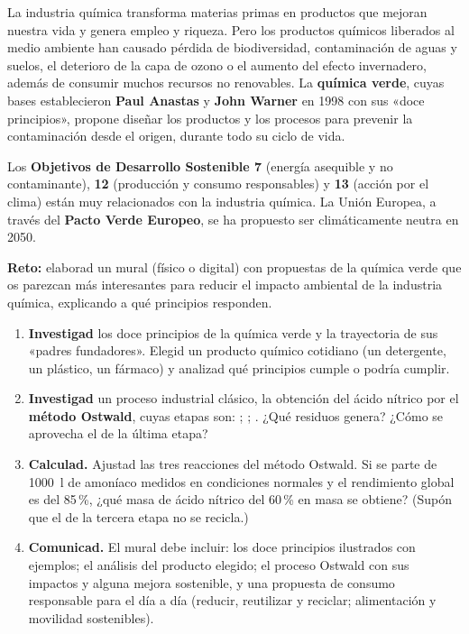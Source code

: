 La industria química transforma materias primas en productos que mejoran nuestra vida y genera empleo y riqueza. Pero los
productos químicos liberados al medio ambiente han causado pérdida de biodiversidad, contaminación de aguas y suelos, el deterioro
de la capa de ozono o el aumento del efecto invernadero, además de consumir muchos recursos no renovables. La \textbf{química verde},
cuyas bases establecieron \textbf{Paul Anastas} y \textbf{John Warner} en 1998 con sus «doce principios», propone diseñar los
productos y los procesos para prevenir la contaminación desde el origen, durante todo su ciclo de vida.

Los \textbf{Objetivos de Desarrollo Sostenible 7} (energía asequible y no contaminante), \textbf{12} (producción y consumo
responsables) y \textbf{13} (acción por el clima) están muy relacionados con la industria química. La Unión Europea, a través del
\textbf{Pacto Verde Europeo}, se ha propuesto ser climáticamente neutra en 2050.

\begin{marker}
    \textbf{Reto:} elaborad un mural (físico o digital) con propuestas de la química verde que os parezcan más interesantes para
    reducir el impacto ambiental de la industria química, explicando a qué principios responden.
\end{marker}

\begin{enumerate}[label=\numberballred]
    \item \textbf{Investigad} los doce principios de la química verde y la trayectoria de sus «padres fundadores». Elegid un producto
    químico cotidiano (un detergente, un plástico, un fármaco) y analizad qué principios cumple o podría cumplir.
    \item \textbf{Investigad} un proceso industrial clásico, la obtención del ácido nítrico por el \textbf{método Ostwald}, cuyas
    etapas son:
    ; ; . ¿Qué residuos genera? ¿Cómo se
    aprovecha el  de la última etapa?
    \item \textbf{Calculad.} Ajustad las tres reacciones del método Ostwald. Si se parte de \qty{1000}{\litre} de amoníaco medidos
    en condiciones normales y el rendimiento global es del 85\,\%, ¿qué masa de ácido nítrico del 60\,\% en masa se obtiene?
    (Supón que el  de la tercera etapa no se recicla.)
    \item \textbf{Comunicad.} El mural debe incluir: los doce principios ilustrados con ejemplos; el análisis del producto elegido;
    el proceso Ostwald con sus impactos y alguna mejora sostenible, y una propuesta de consumo responsable para el día a día
    (reducir, reutilizar y reciclar; alimentación y movilidad sostenibles).
\end{enumerate}

